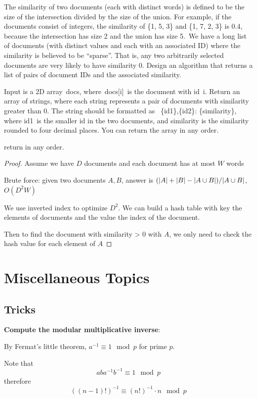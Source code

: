 \documentclass[11pt]{article}
\begin{document}
\begin{problem}
The similarity of two documents (each with distinct words) is defined to be the size of the
intersection divided by the size of the union. For example, if the documents consist of
integers, the similarity of \{1, 5, 3\} and \{1, 7, 2, 3\} is 0.4, because the intersection has size
2 and the union has size 5. We have a long list of documents (with distinct values and each with
an associated ID) where the similarity is believed to be ``sparse''. That is, any two arbitrarily
selected documents are very likely to have similarity 0. Design an algorithm that returns a list
of pairs of document IDs and the associated similarity.

Input is a 2D array docs, where docs[i] is the document with id i. Return an array of strings,
where each string represents a pair of documents with similarity greater than 0. The string
should be formatted as  \{id1\},\{id2\}: \{similarity\}, where id1 is the smaller id in the two
documents, and similarity is the similarity rounded to four decimal places. You can return the
array in any order.

return in any order.
\end{problem}

\begin{proof}
Assume we have \(D\) documents and each document has at most \(W\) words

Brute force: given two documents \(A, B\), answer
is \((\abs{A}+\abs{B}-\abs{A\cup B})/\abs{A\cup B}\), \(O(D^2W)\)

We use inverted index to optimize \(D^2\). We can build a hash table with key the elements of
documents and the value the index of the document.

Then to find the document with similarity > 0 with \(A\), we only need to check the hash value
for each element of \(A\)
\end{proof}
\section{Miscellaneous Topics}
\label{sec:orgfac7eb6}
\subsection{Tricks}
\label{sec:org74f2850}
\textbf{Compute the modular multiplicative inverse}:

By Fermat's little theorem, \(a^{-1}\equiv 1\mod p\) for prime \(p\).

Note that
\begin{equation*}
aba^{-1}b^{-1}\equiv 1\mod p
\end{equation*}
therefore
\begin{equation*}
((n-1)!)^{-1}\equiv(n!)^{-1}\cdot n\mod p
\end{equation*}
\end{document}
